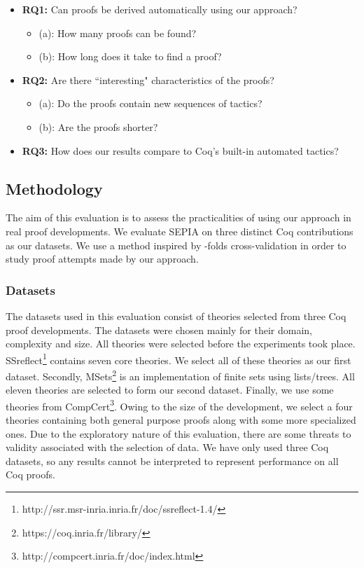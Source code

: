\documentclass{llncs}
\begin{document}
\begin{itemize}
\item{{\bf RQ1: }Can proofs be derived automatically using our approach?}
\begin{itemize}
    \item (a): How many proofs can be found?
    \item (b): How long does it take to find a proof?
  \end{itemize}
\item{{\bf RQ2: }Are there ``interesting" characteristics of the proofs?}
\begin{itemize}
    \item (a): Do the proofs contain new sequences of tactics?
    \item (b): Are the proofs shorter?
  \end{itemize}
\item{{\bf RQ3: }How does our results compare to Coq's built-in automated tactics?}
\end{itemize}

\subsection{Methodology}
The aim of this evaluation is to assess the practicalities of using our approach in real proof developments. We evaluate SEPIA on three distinct Coq contributions as our datasets. We use a method inspired by -folds cross-validation \cite{KohaviIJCAI} in order to study proof attempts made by our approach.

\vspace{-3mm}

\subsubsection{Datasets}
The datasets used in this evaluation consist of theories selected from three Coq proof developments. The datasets were chosen mainly for their domain, complexity and size. All theories were selected before the experiments took place. SSreflect\footnote{http://ssr.msr-inria.inria.fr/doc/ssreflect-1.4/} contains seven core theories. We select all of these theories as our first dataset. Secondly, MSets\footnote{https://coq.inria.fr/library/} is an implementation of finite sets using lists/trees. All eleven theories are selected to form our second dataset. Finally, we use some theories from CompCert\footnote{http://compcert.inria.fr/doc/index.html}. Owing to the size of the development, we select a four theories containing both general purpose proofs along with some more specialized ones. Due to the exploratory nature of this evaluation, there are some threats to validity associated with the selection of data. We have only used three Coq datasets, so any results cannot be interpreted to represent performance on all Coq proofs.
\end{document}
